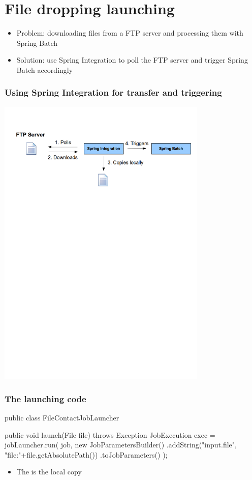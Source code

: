 \section{File dropping launching}

\begin{frame}
 \begin{itemize}
  \item Problem: downloading files from a FTP server and processing them with Spring Batch
  \item Solution: use Spring Integration to poll the FTP server and trigger Spring Batch accordingly
 \end{itemize}
\end{frame}

\begin{frame}
 \frametitle{Using Spring Integration for transfer and triggering}
 \begin{center}
  \includegraphics[width=10cm]{figures/spring-integration-ftp-poller.pdf}
 \end{center}
\end{frame}


\begin{frame}[fragile]
 \frametitle{The launching code}
 \begin{javacode}
public class FileContactJobLauncher {

  public void launch(File file) throws Exception {
      JobExecution exec = jobLauncher.run(
        job, 
        new JobParametersBuilder()
          .addString("input.file", "file:"+file.getAbsolutePath())
          .toJobParameters()
      );
  }

}  
 \end{javacode}

 \begin{itemize}
  \item The  is the local copy
 \end{itemize}
\end{frame}


